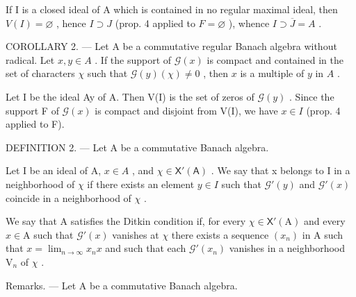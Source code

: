 If I is a closed ideal of A which is contained in no regular maximal ideal, then \(V(I) = \varnothing\) , hence \(I \supset J\) (prop. 4 applied to \(F = \varnothing\) ), whence \(I \supset \overline{J} = A\) .

COROLLARY 2. --- Let A be a commutative regular Banach algebra without radical. Let \(x, y \in A\) . If the support of \(\mathcal{G}(x)\) is compact and contained in the set of characters \(\chi\) such that \(\mathcal{G}(y)(\chi) \neq 0\) , then \(x\) is a multiple of \(y\) in \(A\) .

Let I be the ideal Ay of A. Then V(I) is the set of zeros of \(\mathcal{G}(y)\) . Since the support F of \(\mathcal{G}(x)\) is compact and disjoint from V(I), we have \(x \in I\) (prop. 4 applied to F).

DEFINITION 2. --- Let A be a commutative Banach algebra.

Let I be an ideal of A, \(x \in A\) , and \(\chi \in \mathsf{X}'(\mathsf{A})\) . We say that x belongs to I in a neighborhood of \(\chi\) if there exists an element \(y \in I\) such that \(\mathcal{G}'(y)\) and \(\mathcal{G}'(x)\) coincide in a neighborhood of \(\chi\) .

We say that A satisfies the Ditkin condition if, for every \(\chi \in \mathsf{X}'(\mathrm{A})\) and every \(x \in \mathrm{A}\) such that \(\mathcal{G}'(x)\) vanishes at \(\chi\) there exists a sequence \((x_n)\) in A such that \(x = \lim_{n \to \infty} x_n x\) and such that each \(\mathcal{G}'(x_n)\) vanishes in a neighborhood \(\mathrm{V}_n\) of \(\chi\) .

Remarks. --- Let A be a commutative Banach algebra.

